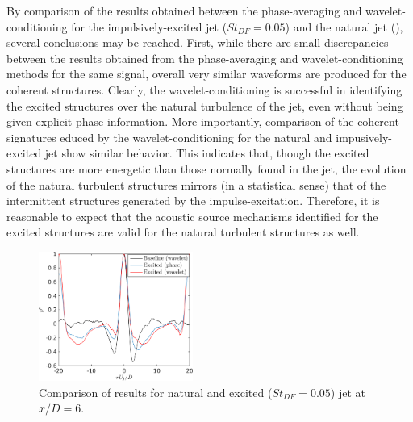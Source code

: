 By comparison of the results obtained between the phase-averaging and wavelet-conditioning for the impulsively-excited jet ($St_{DF} = 0.05$) and the natural jet (), several conclusions may be reached.
First, while there are small discrepancies between the results obtained from the phase-averaging and wavelet-conditioning methods for the same signal, overall very similar waveforms are produced for the coherent structures.
Clearly, the wavelet-conditioning is successful in identifying the excited structures over the natural turbulence of the jet, even without being given explicit phase information.
More importantly, comparison of the coherent signatures educed by the wavelet-conditioning for the natural and impusively-excited jet show similar behavior.
This indicates that, though the excited structures are more energetic than those normally found in the jet, the evolution of the natural turbulent structures mirrors (in a statistical sense) that of the intermittent structures generated by the impulse-excitation.
Therefore, it is reasonable to expect that the acoustic source mechanisms identified for the excited structures are valid for the natural turbulent structures as well.
\begin{figure}
	\centering
	\includegraphics[width=0.45\textwidth]{Figures/conditioning/Phase-wavelet_comparison_x6D.png}
	\caption{Comparison of results for natural and excited ($St_{DF} = 0.05$) jet at $x/D = 6$.}
	\label{fig:phase-wavelet_comparison}
\end{figure}

